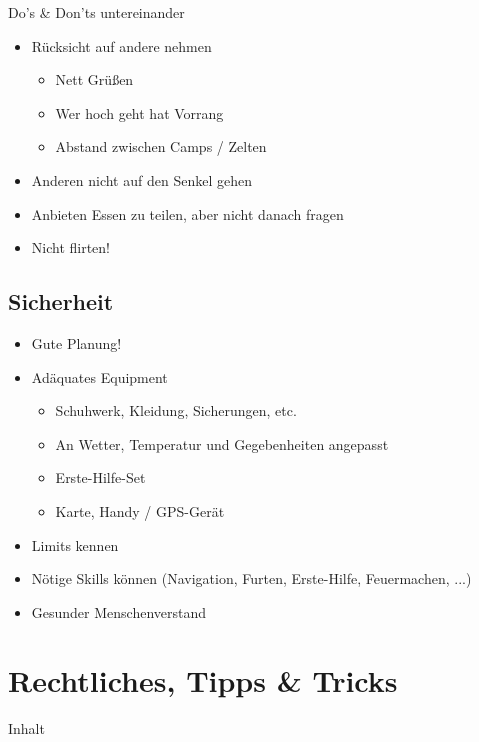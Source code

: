 \documentclass[aspectratio=169]{beamer}
\begin{document}
			\begin{frame}{Do's \& Don'ts untereinander}
				\begin{itemize}
					\item Rücksicht auf andere nehmen
					\begin{itemize}
						\item Nett Grüßen
						\item Wer hoch geht hat Vorrang
						\item Abstand zwischen Camps / Zelten
					\end{itemize}
					\item Anderen nicht auf den Senkel gehen
					\item Anbieten Essen zu teilen, aber nicht danach fragen
					\item Nicht flirten!
				\end{itemize}
			\end{frame}
			
		\subsection{Sicherheit}
			
			\begin{frame}{}
				\begin{itemize}
					\item Gute Planung!
					\item Adäquates Equipment
					\begin{itemize}
						\item Schuhwerk, Kleidung, Sicherungen, etc.
						\item An Wetter, Temperatur und Gegebenheiten angepasst
						\item Erste-Hilfe-Set
						\item Karte, Handy / GPS-Gerät
					\end{itemize}
					\item Limits kennen
					\item Nötige Skills können (Navigation, Furten, Erste-Hilfe, Feuermachen, ...)\pause
					\item Gesunder Menschenverstand
				\end{itemize}
			\end{frame}
	
	\section{Rechtliches, Tipps \& Tricks}
		
		\begin{frame}[t]{Inhalt}
		\end{frame}
	
\end{document}
